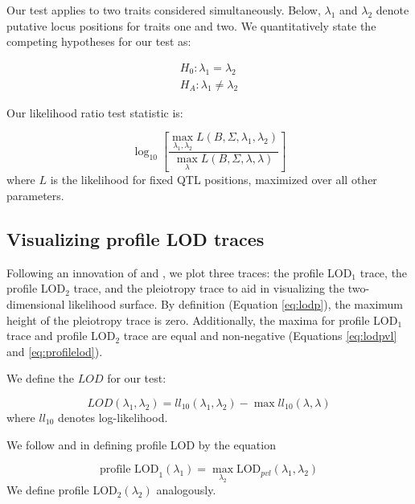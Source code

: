 \documentclass[12pt,twoside, lineno]{gsajnl}
\begin{document}
Our test applies to two traits considered simultaneously. Below,
$\lambda_1$ and $\lambda_2$ denote putative locus positions for traits
one and two. We quantitatively state the competing hypotheses for our
test as:

\begin{eqnarray}
H_0: \lambda_1 = \lambda_2 \nonumber\\
H_A: \lambda_1 \neq \lambda_2
\label{eqn:hypotheses}
\end{eqnarray}

\noindent Our likelihood ratio test statistic is:

\begin{equation}
\log_{10} \left[ \frac{\max_{\lambda_1, \lambda_2} L(B, \Sigma, \lambda_1, \lambda_2)}{
    \max_\lambda L(B, \Sigma, \lambda, \lambda)} \right]
\label{eqn:test-statistic}
\end{equation}
where $L$ is the likelihood for fixed QTL positions,
maximized over all other parameters.

\subsection{Visualizing profile LOD traces}

Following an innovation of \citet{zeng2000genetic} and
\citet{tian2016dissection}, we plot three traces: the profile LOD$_1$
trace, the profile LOD$_2$ trace, and the pleiotropy trace to aid in
visualizing the two-dimensional likelihood surface. By definition
(Equation \ref{eq:lodp}), the maximum height of the pleiotropy trace
is zero. Additionally, the maxima for profile LOD$_1$ trace and
profile LOD$_2$ trace are equal and non-negative (Equations
\ref{eq:lodpvl} and \ref{eq:profilelod}).

We define the $LOD$ for our test:

\begin{equation}
LOD(\lambda_1, \lambda_2) = ll_{10}(\lambda_1, \lambda_2) - \max ll_{10}(\lambda, \lambda)
\label{eq:lodpvl}
\end{equation}
where $ll_{10}$ denotes log-likelihood.

We follow \citet{zeng2000genetic} and \citet{tian2016dissection} in
defining profile LOD by the equation

\begin{equation}
\text{profile LOD}_1(\lambda_1) = \max_{\lambda_2}\text{LOD}_{pvl}(\lambda_1, \lambda_2)
\label{eq:profilelod}
\end{equation}
We define profile LOD$_2(\lambda_2)$ analogously.
\end{document}
